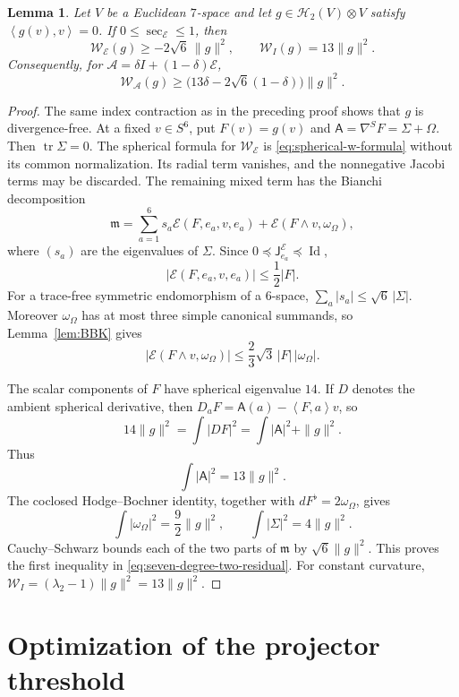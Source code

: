 \documentclass[reqno,11pt]{amsart}
\newtheorem{lemma}[theorem]{Lemma}
\theoremstyle{definition}
\newcommand{\cA}{\mathcal A}
\newcommand{\cE}{\mathcal E}
\newcommand{\tr}{\operatorname{tr}}
\newcommand{\Id}{\operatorname{Id}}
\newcommand{\Harm}{\mathscr H}
\newcommand{\inner}[2]{\left\langle #1,#2\right\rangle}
\begin{document}
\begin{lemma}
\label{lem:seven-degree-two-estimate}
Let $V$ be a Euclidean $7$-space and let
$g\in\Harm_2(V)\otimes V$ satisfy $\inner{g(v)}v=0$.  If
$0\leq\sec_{\cE}\leq1$, then
\begin{equation}\label{eq:seven-degree-two-residual}
  \mathcal W_{\cE}(g)\geq-2\sqrt6\,\|g\|^2,
  \qquad
  \mathcal W_I(g)=13\|g\|^2.
\end{equation}
Consequently, for $\cA=\delta I+(1-\delta)\cE$,
\begin{equation*}
  \mathcal W_{\cA}(g)
  \geq\bigl(13\delta-2\sqrt6(1-\delta)\bigr)\|g\|^2.
\end{equation*}
\end{lemma}

\begin{proof}
The same index contraction as in the preceding proof shows that $g$ is
divergence-free.  At a fixed $v\in S^6$, put
$F(v)=g(v)$ and $\mathsf A=\nabla^SF=\Sigma+\Omega$.  Then
$\tr\Sigma=0$.  The spherical formula for $\mathcal W_{\cE}$ is
\eqref{eq:spherical-w-formula} without its common normalization.  Its
radial term vanishes, and the nonnegative Jacobi terms may be discarded.
The remaining mixed term has the Bianchi decomposition
$$
  \mathfrak m
  =\sum_{a=1}^{6}s_a\cE(F,e_a,v,e_a)
   +\cE(F\wedge v,\omega_\Omega),
$$
where $(s_a)$ are the eigenvalues of $\Sigma$.  Since
$0\preceq\mathsf J_{e_a}^{\cE}\preceq\Id$,
$$
  |\cE(F,e_a,v,e_a)|\leq\frac12|F|.
$$
For a trace-free symmetric endomorphism of a $6$-space,
$\sum_a|s_a|\leq\sqrt6\,|\Sigma|$.  Moreover
$\omega_\Omega$ has at most three simple canonical summands, so
Lemma~\ref{lem:BBK} gives
$$
  |\cE(F\wedge v,\omega_\Omega)|
  \leq\frac23\sqrt3\,|F|\,|\omega_\Omega|.
$$

The scalar components of $F$ have spherical eigenvalue $14$.  If $D$
denotes the ambient spherical derivative, then
$D_aF=\mathsf A(a)-\inner{F}{a}v$, so
$$
 14\|g\|^2=\int|DF|^2=\int|\mathsf A|^2+\|g\|^2.
$$
Thus
$$
  \int|\mathsf A|^2=13\|g\|^2.
$$
The coclosed Hodge--Bochner identity, together with
$dF^\flat=2\omega_\Omega$, gives
$$
  \int|\omega_\Omega|^2=\frac92\|g\|^2,
  \qquad
  \int|\Sigma|^2=4\|g\|^2.
$$
Cauchy--Schwarz bounds each of the two parts of $\mathfrak m$ by
$\sqrt6\|g\|^2$.  This proves the first inequality in
\eqref{eq:seven-degree-two-residual}.  For constant curvature,
$\mathcal W_I=(\lambda_2-1)\|g\|^2=13\|g\|^2$.
\end{proof}

\section{Optimization of the projector threshold}\label{app:projector-optimization}
\end{document}

